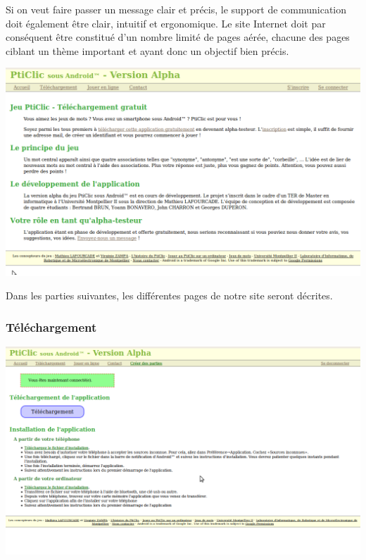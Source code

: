 \documentclass[a4paper,11pt,french]{article}
\begin{document}
Si on veut faire passer un message clair et précis, le support de communication doit également être clair, intuitif et ergonomique. Le site Internet 
doit par conséquent être constitué d'un nombre limité de pages aérée, chacune des pages ciblant un thème important et ayant donc un objectif bien précis.

\begin{center}
\includegraphics[width=14cm]{img/siteAccueil.png}
\end{center}

Dans les parties suivantes, les différentes pages de notre site seront décrites. 



\subsubsection{Téléchargement}

\begin{center}
\includegraphics[width=14cm]{img/siteTelechargement.png}
\end{center}
\end{document}
